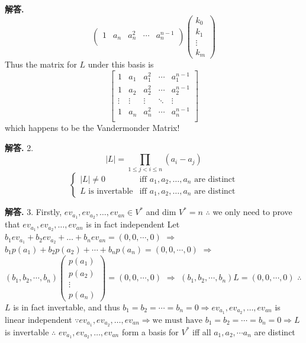 \documentclass[12pt, a4paper, oneside]{article}
\newenvironment{solution}{\par\noindent\textbf{解答. }}{\par}
\begin{document}
\begin{CJK}{UTF8}{gbsn}
\begin{solution}
$$\begin{pmatrix}
    1 & a_n & a_n^2 & \cdots & a_n^{n-1} \\
  \end{pmatrix} \begin{pmatrix}
    k_0 \\ k_1 \\ \vdots \\ k_m
  \end{pmatrix}$$
  Thus the matrix for $L$ under this basis is 
  $$ \begin{bmatrix}
    1 & a_1 & a_1^2 & \cdots & a_1^{n-1} \\
    1 & a_2 & a_2^2 & \cdots & a_2^{n-1} \\
    \vdots &  \vdots & \vdots  & \ddots & \vdots\\
    1 & a_n & a_n^2 & \cdots & a_n^{n-1} \\
  \end{bmatrix}$$
  which happens to be the Vandermonder Matrix!
\end{solution}

\begin{solution} 
  2. $$ \left| L \right| = \prod_{1 \leq j < i \leq n} (a_i - a_j)$$
  $$ \begin{cases}
    |L| \neq 0 & \text{iff }a_1,a_2,\dots,a_n\text{ are distinct} \\
    L\text{ is invertable} & \text{iff }a_1,a_2,\dots,a_n\text{ are distinct}
  \end{cases}$$
\end{solution}

\begin{solution}
  3. Firstly, $ev_{a_1}, ev_{a_2}, \dots, ev_{an} \in V^*$ and dim $V^* = n$ \newline
  $\therefore$ we only need to prove that $ev_{a_1}, ev_{a_2}, \dots, ev_{an}$ is in fact independent \newline
  Let $b_1ev_{a_1} + b_2ev_{a_2} + \dots +  b_nev_{an} = (0, 0, \cdots, 0)$ \newline
  $\Rightarrow$ $b_1p(a_1) + b_2p(a_2) + \cdots + b_np(a_n) =  (0, 0, \cdots, 0)$ \newline
  $\Rightarrow$ $(b_1, b_2, \cdots, b_n)\begin{pmatrix}
    p(a_1) \\ p(a_2) \\ \vdots \\ p(a_n) 
  \end{pmatrix} = (0, 0, \cdots, 0)$ \newline
  $\Rightarrow $ $(b_1, b_2, \cdots, b_n)L = (0, 0, \cdots, 0)$ \newline
  $\therefore$ $L$ is in fact invertable, and thus $b_1 = b_2 = \cdots = b_n = 0 \Rightarrow ev_{a_1}, ev_{a_2}, \dots, ev_{an}$ is linear independent \newline
  $\because ev_{a_1}, ev_{a_2}, \dots, ev_{an} \Rightarrow \text{we must have } b_1 = b_2 = \cdots = b_n = 0 \Rightarrow L$ is invertable \newline
  $\therefore$ $ev_{a_1}, ev_{a_2}, \dots, ev_{an}$ form a basis for $V^*$ iff all $a_1,a_2,\dotsm a_n$ are distinct
\end{solution}


\end{CJK}
\end{document}
